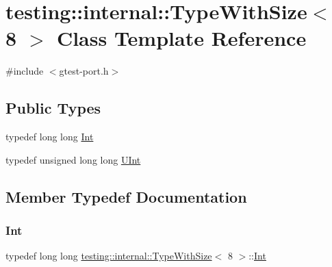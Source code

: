 \hypertarget{classtesting_1_1internal_1_1_type_with_size_3_018_01_4}{}\section{testing\+::internal\+::Type\+With\+Size$<$ 8 $>$ Class Template Reference}
\label{classtesting_1_1internal_1_1_type_with_size_3_018_01_4}


{\ttfamily \#include $<$gtest-\/port.\+h$>$}

\subsection*{Public Types}
\begin{DoxyCompactItemize}
\item 
typedef long long \mbox{\hyperlink{classtesting_1_1internal_1_1_type_with_size_3_018_01_4_a36d5697e5f5254b0495f13c97d747e36}{Int}}
\item 
typedef unsigned long long \mbox{\hyperlink{classtesting_1_1internal_1_1_type_with_size_3_018_01_4_a747e21c5aee8faf07ec65cd4c3d1ca62}{U\+Int}}
\end{DoxyCompactItemize}


\subsection{Member Typedef Documentation}
\mbox{\label{classtesting_1_1internal_1_1_type_with_size_3_018_01_4_a36d5697e5f5254b0495f13c97d747e36}} 
\subsubsection{\texorpdfstring{Int}{Int}}
{\footnotesize\ttfamily typedef long long \mbox{\hyperlink{classtesting_1_1internal_1_1_type_with_size}{testing\+::internal\+::\+Type\+With\+Size}}$<$ 8 $>$\+::\mbox{\hyperlink{classtesting_1_1internal_1_1_type_with_size_3_018_01_4_a36d5697e5f5254b0495f13c97d747e36}{Int}}}

\mbox{\label{classtesting_1_1internal_1_1_type_with_size_3_018_01_4_a747e21c5aee8faf07ec65cd4c3d1ca62}} 
